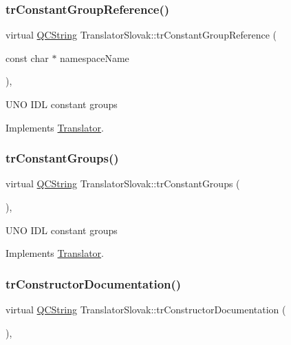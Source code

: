 \subsubsection{\texorpdfstring{trConstantGroupReference()}{trConstantGroupReference()}}
{\footnotesize\ttfamily virtual \mbox{\hyperlink{class_q_c_string}{Q\+C\+String}} Translator\+Slovak\+::tr\+Constant\+Group\+Reference (\begin{DoxyParamCaption}\item[{const char $\ast$}]{namespace\+Name }\end{DoxyParamCaption})\hspace{0.3cm}{\ttfamily [inline]}, {\ttfamily [virtual]}}

U\+NO I\+DL constant groups 

Implements \mbox{\hyperlink{class_translator}{Translator}}.

\mbox{\label{class_translator_slovak_ac2d6a45f622265a45c2575ed0c859e6a}} 
\subsubsection{\texorpdfstring{trConstantGroups()}{trConstantGroups()}}
{\footnotesize\ttfamily virtual \mbox{\hyperlink{class_q_c_string}{Q\+C\+String}} Translator\+Slovak\+::tr\+Constant\+Groups (\begin{DoxyParamCaption}{ }\end{DoxyParamCaption})\hspace{0.3cm}{\ttfamily [inline]}, {\ttfamily [virtual]}}

U\+NO I\+DL constant groups 

Implements \mbox{\hyperlink{class_translator}{Translator}}.

\mbox{\label{class_translator_slovak_a7d6d0b910e2bb7cbec6f68531f8dd8f5}} 
\subsubsection{\texorpdfstring{trConstructorDocumentation()}{trConstructorDocumentation()}}
{\footnotesize\ttfamily virtual \mbox{\hyperlink{class_q_c_string}{Q\+C\+String}} Translator\+Slovak\+::tr\+Constructor\+Documentation (\begin{DoxyParamCaption}{ }\end{DoxyParamCaption})\hspace{0.3cm}{\ttfamily [inline]}, {\ttfamily [virtual]}}

